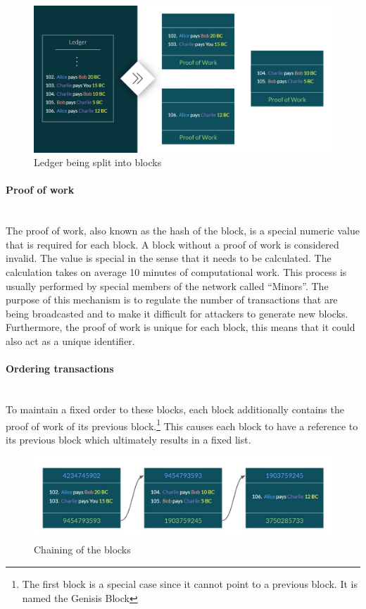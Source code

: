 \documentclass[a4paper, 12pt]{report}
\begin{document}
\begin{figure}[h]
	\includegraphics[width=\textwidth]{02_Ledger_Blocks}
	\caption{Ledger being split into blocks}
	\label{fig:02_Ledger_Blocks}
\end{figure}

\paragraph{Proof of work} \hspace{0pt} \\
The proof of work, also known as the hash of the block, is a special numeric value that is required for each block. A block without a proof of work is considered invalid. The value is special in the sense that it needs to be calculated. The calculation takes on average 10 minutes of computational work. This process is usually performed by special members of the network called “Minors”. The purpose of this mechanism is to regulate the number of transactions that are being broadcasted and to make it difficult for attackers to generate new blocks. Furthermore, the proof of work is unique for each block, this means that it could also act as a unique identifier.
\paragraph{Ordering transactions} \hspace{0pt} \\
To maintain a fixed order to these blocks, each block additionally contains the proof of work of its previous block.\footnote{The first block is a special case since it cannot point to a previous block. It is named the Genisis Block} This causes each block to have a reference to its previous block which ultimately results in a fixed list.

\begin{figure}[h]
	\includegraphics[width=\textwidth]{03_Linked_Blocks}
	\caption{Chaining of the blocks}
	\label{fig:03_Linked_Blocks}
\end{figure}
\end{document}
